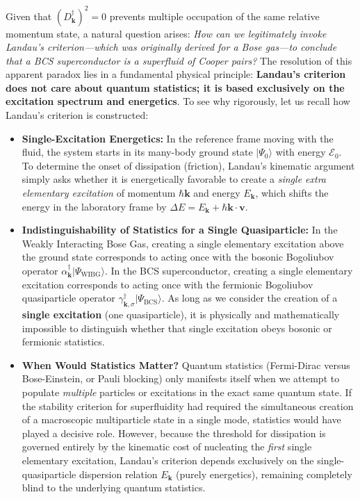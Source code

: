 Given that \( (D_{\mathbf{k}}^\dagger)^2 = 0 \) prevents multiple occupation of the same relative momentum state, a natural question arises: \emph{How can we legitimately invoke Landau's criterion—which was originally derived for a Bose gas—to conclude that a BCS superconductor is a superfluid of Cooper pairs?} The resolution of this apparent paradox lies in a fundamental physical principle: \textbf{Landau's criterion does not care about quantum statistics; it is based exclusively on the excitation spectrum and energetics}. To see why rigorously, let us recall how Landau's criterion is constructed:
\begin{itemize}
    \item \textbf{Single-Excitation Energetics:} In the reference frame moving with the fluid, the system starts in its many-body ground state \( |\Psi_0\rangle \) with energy \( \mathcal{E}_0 \). To determine the onset of dissipation (friction), Landau's kinematic argument simply asks whether it is energetically favorable to create a \emph{single extra elementary excitation} of momentum \( \hbar\mathbf{k} \) and energy \( E_{\mathbf{k}} \), which shifts the energy in the laboratory frame by \( \Delta E = E_{\mathbf{k}} + \hbar\mathbf{k} \cdot \mathbf{v} \).
    \item \textbf{Indistinguishability of Statistics for a Single Quasiparticle:} In the Weakly Interacting Bose Gas, creating a single elementary excitation above the ground state corresponds to acting once with the bosonic Bogoliubov operator \( \alpha_{\mathbf{k}}^\dagger |\Psi_{\text{WIBG}}\rangle \). In the BCS superconductor, creating a single elementary excitation corresponds to acting once with the fermionic Bogoliubov quasiparticle operator \( \gamma_{\mathbf{k},\sigma}^\dagger |\Psi_{\text{BCS}}\rangle \). As long as we consider the creation of a \textbf{single excitation} (one quasiparticle), it is physically and mathematically impossible to distinguish whether that single excitation obeys bosonic or fermionic statistics.
    \item \textbf{When Would Statistics Matter?} Quantum statistics (Fermi-Dirac versus Bose-Einstein, or Pauli blocking) only manifests itself when we attempt to populate \emph{multiple} particles or excitations in the exact same quantum state. If the stability criterion for superfluidity had required the simultaneous creation of a macroscopic multiparticle state in a single mode, statistics would have played a decisive role. However, because the threshold for dissipation is governed entirely by the kinematic cost of nucleating the \emph{first} single elementary excitation, Landau's criterion depends exclusively on the single-quasiparticle dispersion relation \( E_{\mathbf{k}} \) (purely energetics), remaining completely blind to the underlying quantum statistics.
\end{itemize}

